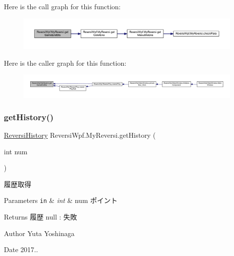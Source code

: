 Here is the call graph for this function\+:
\nopagebreak
\begin{figure}[H]
\begin{center}
\leavevmode
\includegraphics[width=350pt]{class_reversi_wpf_1_1_my_reversi_a77a81c9c08a6dadcab0dd5741de1b88b_cgraph}
\end{center}
\end{figure}
Here is the caller graph for this function\+:
\nopagebreak
\begin{figure}[H]
\begin{center}
\leavevmode
\includegraphics[width=350pt]{class_reversi_wpf_1_1_my_reversi_a77a81c9c08a6dadcab0dd5741de1b88b_icgraph}
\end{center}
\end{figure}
\mbox{\label{class_reversi_wpf_1_1_my_reversi_aa85fcb151ab7c188b0637b9eb9269baa}} 
\subsubsection{\texorpdfstring{get\+History()}{getHistory()}}
{\footnotesize\ttfamily \hyperlink{class_reversi_wpf_1_1_reversi_history}{Reversi\+History} Reversi\+Wpf.\+My\+Reversi.\+get\+History (\begin{DoxyParamCaption}\item[{int}]{num }\end{DoxyParamCaption})}



履歴取得 


\begin{DoxyParams}[1]{Parameters}
\mbox{\tt in}  & {\em int} & num ポイント \\
\hline
\end{DoxyParams}
\begin{DoxyReturn}{Returns}
履歴 null \+: 失敗 
\end{DoxyReturn}
\begin{DoxyAuthor}{Author}
Yuta Yoshinaga 
\end{DoxyAuthor}
\begin{DoxyDate}{Date}
2017.. 
\end{DoxyDate}


